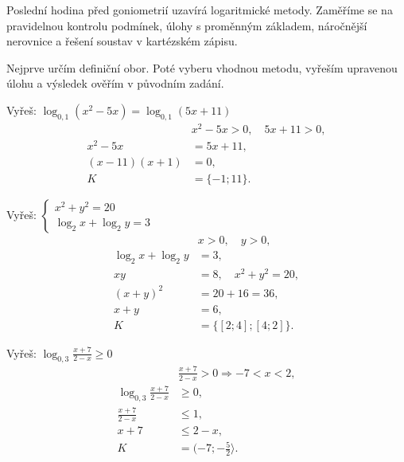 \documentclass[11pt,a4paper]{article}
\begin{document}
Poslední hodina před goniometrií uzavírá logaritmické metody. Zaměříme se na pravidelnou kontrolu podmínek, úlohy s proměnným základem, náročnější nerovnice a řešení soustav v kartézském zápisu.

Nejprve určím definiční obor. Poté vyberu vhodnou metodu, vyřeším upravenou úlohu a výsledek ověřím v původním zadání.


\begin{prikladReseniBox}[title={Příklad 1}]
Vyřeš: $\displaystyle \log_{0{,}1}(x^2-5x)=\log_{0{,}1}(5x+11)$
\tcblower
\[
\begin{aligned}
&x^2-5x>0,\quad5x+11>0,\\
x^2-5x&=5x+11,\\
(x-11)(x+1)&=0,\\
K&=\{-1;11\}.
\end{aligned}
\]
\end{prikladReseniBox}
\begin{prikladReseniBox}[title={Příklad 2}]
Vyřeš: $\displaystyle \begin{cases}x^2+y^2=20\\ \log_2 x+\log_2 y=3\end{cases}$
\tcblower
\[
\begin{aligned}
&x>0,\quad y>0,\\
\log_2x+\log_2y&=3,\\
xy&=8,\quad x^2+y^2=20,\\
(x+y)^2&=20+16=36,\\
x+y&=6,\\
K&=\{[2;4];[4;2]\}.
\end{aligned}
\]
\end{prikladReseniBox}
\begin{prikladReseniBox}[title={Příklad 3}]
Vyřeš: $\displaystyle \log_{0{,}3}\frac{x+7}{2-x}\ge0$
\tcblower
\[
\begin{aligned}
&\frac{x+7}{2-x}>0\Longrightarrow -7<x<2,\\
\log_{0{,}3}\!\frac{x+7}{2-x}&\ge0,\\
\frac{x+7}{2-x}&\le1,\\
x+7&\le2-x,\\
K&=(-7;-\tfrac52\rangle.
\end{aligned}
\]
\end{prikladReseniBox}
\end{document}

